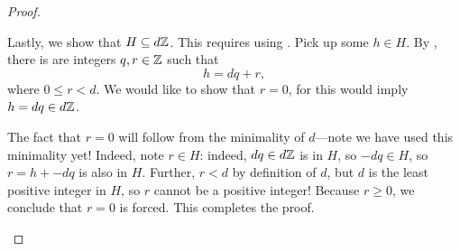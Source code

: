 \documentclass[../notes.tex]{subfiles}
\begin{document}
\begin{proof}
\begin{listalph}
        Lastly, we show that $H\subseteq d\mathbb Z$. This requires using . Pick up some $h\in H$. By , there is are integers $q,r\in\mathbb Z$ such that
        \[h=dq+r,\]
        where $0\le r<d$. We would like to show that $r=0$, for this would imply $h=dq\in d\mathbb Z$.
        
        The fact that $r=0$ will follow from the minimality of $d$---note we have used this minimality yet! Indeed, note $r\in H$: indeed, $dq\in d\mathbb Z$ is in $H$, so $-dq\in H$, so $r=h+-dq$ is also in $H$. Further, $r<d$ by definition of $d$, but $d$ is the least positive integer in $H$, so $r$ cannot be a positive integer! Because $r\ge0$, we conclude that $r=0$ is forced. This completes the proof.
        \qedhere
    \end{listalph}
\end{proof}






\end{document}
